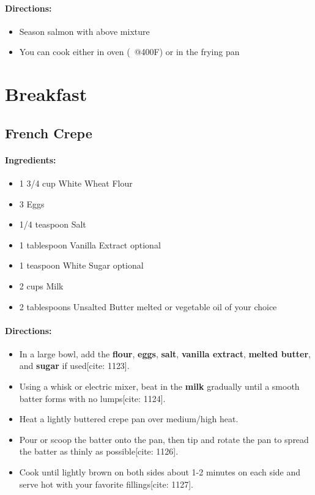 \documentclass{article}
\begin{document}
\paragraph{Directions:}
\begin{itemize}
    \item Season salmon with above mixture
    \item You can cook either in oven (~@400F) or in the frying pan
\end{itemize}

\section{Breakfast}


\subsection{French Crepe}

\paragraph{Ingredients:}
\begin{itemize}
    \item 1 3/4 cup White Wheat Flour
    \item 3 Eggs
    \item 1/4 teaspoon Salt
    \item 1 tablespoon Vanilla Extract optional
    \item 1 teaspoon White Sugar optional
    \item 2 cups Milk
    \item 2 tablespoons Unsalted Butter melted or vegetable oil of your choice
\end{itemize}

\paragraph{Directions:}
\begin{itemize}
    \item In a large bowl, add the \textbf{flour}, \textbf{eggs}, \textbf{salt}, \textbf{vanilla extract}, \textbf{melted butter}, and \textbf{sugar} if used[cite: 1123].
    \item Using a whisk or electric mixer, beat in the \textbf{milk} gradually until a smooth batter forms with no lumps[cite: 1124].
    \item Heat a lightly buttered crepe pan over medium/high heat.
    \item Pour or scoop the batter onto the pan, then tip and rotate the pan to spread the batter as thinly as possible[cite: 1126].
    \item Cook until lightly brown on both sides about 1-2 minutes on each side and serve hot with your favorite fillings[cite: 1127].
\end{itemize}
\end{document}
